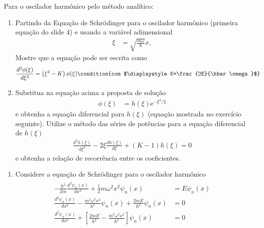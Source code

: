 \begin{prob}
	Para o oscilador harmônico pelo método analítico:
	\begin{enumerate}[label=\alph *)]
		\item Partindo da Equação de Schrödinger para o oscilador harmônico (primeira equação do slide 4) e usando a variável adimensional
			\begin{align}
				\xi &= \sqrt{\frac{m \omega}{\hbar}}x,
			\end{align}
			Mostre que a equação pode ser escrita como
			\begin{dmath*}
				\frac{d^{2} \phi(\xi)}{d \xi^{2}} = \left(\xi^{2}-K\right) \phi(\xi)\condition{com $\displaystyle K=\frac{2E}{\hbar \omega}$}
			\end{dmath*}
		\item Substitua na equação acima a proposta de solução
			\begin{align}
				\phi(\xi) &= h(\xi)\mathrm{e}^{-\xi^{2}/2}
			\end{align}
			e obtenha a equação diferencial para $h(\xi)$ (equação mostrada no exercício seguinte).
			Utilize o método das séries de potências para a equação diferencial de $h(\xi)$
			\begin{align}
				\frac{d^{2}h(\xi)}{d \xi^{2}}-2 \xi \frac{dh(\xi)}{d \xi}+\left(K-1\right)h(\xi)=0
			\end{align}
			e obtenha a relação de recorrência entre os coeficientes.
	\end{enumerate}
	\begin{sol}
		\begin{enumerate}[label=\alph *)]
			\item Considere a equação de Schrödinger para o oscilador harmônico
				\begin{align}
					\begin{split}
						-\frac{\hbar^{2}}{2m}\frac{d^{2} \psi_{n}(x)}{dx^{2}}+\frac{1}{2}m \omega^{2}x^{2} \psi_{n}(x) &= E \psi_{n}(x)\\
						\frac{d^{2} \psi_{n}(x)}{dx^{2}}-\frac{m^{2} \omega^{2} x^{2}}{\hbar^{2}} \psi_{n}(x)+\frac{2mE}{\hbar^{2}} \psi_{n}(x) &= 0\\
						\frac{d^{2} \psi_{n}(x)}{dx^{2}}+\left[\frac{2mE}{\hbar^{2}}-\frac{m^{2} \omega^{2} x^{2}}{\hbar^{2}}\right] \psi_{n}(x) &= 0
					\end{split}
				\end{align}

\end{enumerate}
\end{sol}
\end{prob}
